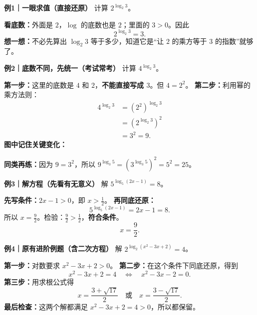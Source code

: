 \begin{examplebox}
	\textbf{\textcolor{CExample}{例1｜一眼求值（直接还原）}}
	计算 $2^{\log_2 3}$。

	\textbf{看底数：}外面是 $2$，$\log$ 的底数也是 $2$；里面的 $3>0$。因此
	\[
	\boxed{2^{\log_2 3}=3}.
	\]
	\textbf{想一想：}不必先算出 $\log_2 3$ 等于多少，知道它是“让 $2$ 的乘方等于 $3$ 的指数”就够了。

	\medskip
	\textbf{\textcolor{CExample}{例2｜底数不同，先统一（考试常考）}}
	计算 $4^{\log_2 3}$。

	\textbf{第一步：}这里的底数是 $4$ 和 $2$，\textbf{不能直接写成 $3$}。但 $4=2^2$。
	\textbf{第二步：}利用幂的乘方法则：
	\[
	\begin{aligned}
	4^{\log_2 3}
	&=(2^2)^{\log_2 3}\\
	&=(2^{\log_2 3})^2\\
	&=3^2=\boxed{9}.
	\end{aligned}
	\]
	\textbf{图中记住关键变化：}
	\begin{center}
	
	\end{center}
	\textbf{同类再练：}因为 $9=3^2$，所以 $9^{\log_3 5}=(3^{\log_3 5})^2=5^2=25$。

	\medskip
	\textbf{\textcolor{CExample}{例3｜解方程（先看有无意义）}}
	解 $5^{\log_5(2x-1)}=8$。

	\textbf{先写条件：}$2x-1>0$，即 $x>\frac12$。
	\textbf{再同底还原：}
	\[
	5^{\log_5(2x-1)}=2x-1=8.
	\]
	所以 $x=\frac92$。检验：$\frac92>\frac12$，\textbf{符合条件}。
	\[
	\boxed{x=\frac92}.
	\]

	\medskip
	\textbf{\textcolor{CExample}{例4｜原有进阶例题（含二次方程）}}
	解 $2^{\log_2(x^2-3x+2)}=4$。

	\textbf{第一步：}对数要求 $x^2-3x+2>0$。
	\textbf{第二步：}在这个条件下同底还原，得到
	\[
	x^2-3x+2=4\quad\Longleftrightarrow\quad x^2-3x-2=0.
	\]
	\textbf{第三步：}用求根公式得
	\[
	\boxed{x=\frac{3+\sqrt{17}}2\quad\text{或}\quad x=\frac{3-\sqrt{17}}2}.
	\]
	\textbf{最后检查：}这两个解都满足 $x^2-3x+2=4>0$，所以都保留。
\end{examplebox}
